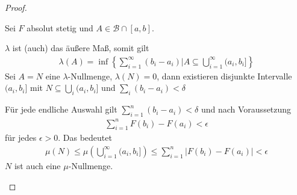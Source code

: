 \documentclass[]{article}
\begin{document}
\begin{proof}
\begin{enumerate}
		Sei $F$ absolut stetig und $A \in \mathcal{B} \cap [a,b]$.
		
		$\lambda$ ist (auch) das äußere Maß, somit gilt
		\begin{align*}
			\lambda(A) = \inf \left\{ \sum_{i=1}^{\infty} (b_i - a_i) \big| A \subseteq \bigcup_{i=1}^{\infty} (a_i,b_i] \right\}
		\end{align*}
		Sei $A=N$ eine $\lambda$-Nullmenge, $\lambda(N)=0$, dann existieren disjunkte Intervalle $(a_i,b_i]$ mit $N \subseteq \bigcup_i (a_i,b_i]$ und $\sum_i (b_i-a_i) < \delta$
	
		Für jede endliche Auswahl gilt $\sum_{i=1}^{n} (b_i - a_i) < \delta$ und nach Voraussetzung
		\begin{align*}
			\sum_{i=1}^{n}F(b_i) - F(a_i) < \epsilon
		\end{align*}
		für jedes $\epsilon > 0$. Das bedeutet
		\begin{align*}
			\mu(N) \leq \mu\left(\bigcup_{i=1}^{\infty} (a_i,b_i]\right) \leq \sum_{i=1}^{n} |F(b_i) - F(a_i)| < \epsilon
		\end{align*}
		$N$ ist auch eine $\mu$-Nullmenge.
	\end{enumerate}
\end{proof}
\end{document}
